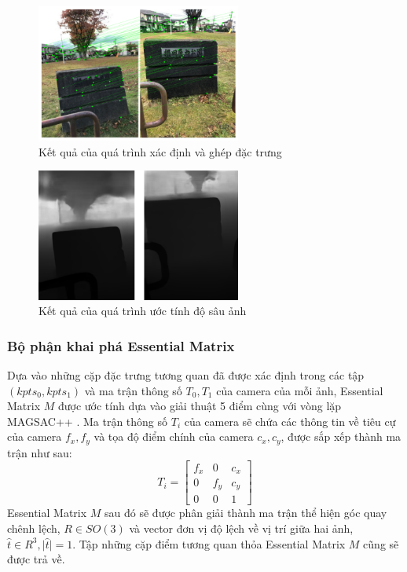 \begin{figure}[H]
  \centering
  \includegraphics[width=0.6\textwidth]{pics/Proposal/matching.png}
  \caption{Kết quả của quá trình xác định và ghép đặc trưng}
\end{figure}

\begin{figure}[H]
  \centering
  \includegraphics[width=0.6\textwidth]{pics/Proposal/depth.png}
  \caption{Kết quả của quá trình ước tính độ sâu ảnh}
\end{figure}

\subsubsection{Bộ phận khai phá Essential Matrix}

Dựa vào những cặp đặc trưng tương quan đã được xác định trong các tập $(kpts_0, kpts_1)$ và ma trận thông số $T_0, T_1$ của camera của mỗi ảnh, Essential Matrix $M$ được ước tính dựa vào giải thuật 5 điểm \cite{nister2004efficient} cùng với vòng lặp MAGSAC++ \cite{barath2020magsac++}. Ma trận thông số $T_i$ của camera sẽ chứa các thông tin về tiêu cự của camera $f_x,f_y$ và tọa độ điểm chính của camera $c_x,c_y$, được sắp xếp thành ma trận như sau:
$$
  T_i = \begin{bmatrix} f_x & 0 & c_x \\ 0 & f_y & c_y \\ 0 & 0 & 1 \end{bmatrix}
$$
Essential Matrix $M$ sau đó sẽ được phân giải thành ma trận thể hiện góc quay chênh lệch, $R \in SO(3)$ và vector đơn vị độ lệch về vị trí giữa hai ảnh, $\hat{t} \in R^{3}, \lvert \hat{t} \rvert = 1$. Tập những cặp điểm tương quan thỏa Essential Matrix $M$ cũng sẽ được trả về.

